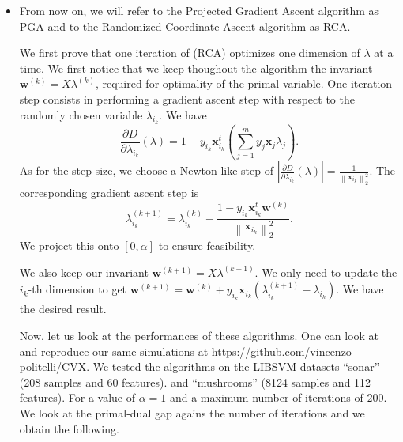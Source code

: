 \documentclass{article}
\begin{document}
\begin{itemize}
       \item From now on, we will refer to the
           Projected Gradient Ascent algorithm
           as PGA and to the Randomized 
           Coordinate Ascent algorithm
           as RCA.

           We first prove that one iteration
           of (RCA) optimizes one
           dimension of $\lambda$ at a time.
           We first notice that we keep
           thoughout the algorithm the
           invariant $\mathbf{w}^{\left(k\right)} = X \lambda^{\left(k\right)}$,
           required for optimality of the primal variable.
           One iteration step
           consists in performing
           a gradient ascent step
           with respect to the randomly
           chosen variable $\lambda_{i_{k}}$.
           We have
           \begin{equation*}
               \frac{\partial D}{\partial \lambda_{i_{k}}} \left(\lambda\right) = 
               1 - y_{i_{k}} \mathbf{x}_{i_{k}}^{t}
               \left(\sum_{j = 1}^{m}y_{j}\mathbf{x}_{j} \lambda_{j}\right).
           \end{equation*}
           As for the step size, we choose a Newton-like
           step of $\left|\frac{\partial D}{\partial \lambda_{i_{k}}}\left(\lambda\right)\right|
           = \frac{1}{\left\|\mathbf{x}_{i_{k}}\right\|_{2}^{2}}$.
           The corresponding gradient ascent step is
           \begin{equation*}
              \lambda^{\left(k+1\right)}_{i_{k}} = 
              \lambda_{i_{k}}^{\left(k\right)} -
              \frac{1 - y_{i_{k}}\mathbf{x}_{i_{k}}^{t}\mathbf{w}^{\left(k\right)}}{\left\|\mathbf{x}_{i_{k}}\right\|^{2}_{2}}.
           \end{equation*}
           We project this onto $\left[0, \alpha\right]$ to ensure
           feasibility.

           We also keep our invariant $\mathbf{w}^{\left(k+1\right)} = X \lambda^{\left(k+1\right)}$.
           We only need to update the $i_{k}$-th dimension to get
           $\mathbf{w}^{\left(k + 1\right)} = \mathbf{w}^{\left(k\right)}
           + y_{i_{k}}\mathbf{x}_{i_{k}} \left(\lambda_{i_{k}}^{\left(k+1\right)} - \lambda_{i_{k}}\right)$.
           We have the desired result.
 
           Now, let us look at the performances of 
           these algorithms. One can look
           at and reproduce our same simulations
           at \url{https://github.com/vincenzo-politelli/CVX}.
           We tested the algorithms on the
           LIBSVM datasets ``sonar'' (208 samples 
           and 60 features).
           and ``mushrooms'' (8124 samples and
           112 features).
           For a value of $\alpha = 1$
           and a maximum number of iterations
           of $200$. We look at the primal-dual
           gap agains the number of
           iterations and we obtain the following.


\end{itemize}
\end{document}

